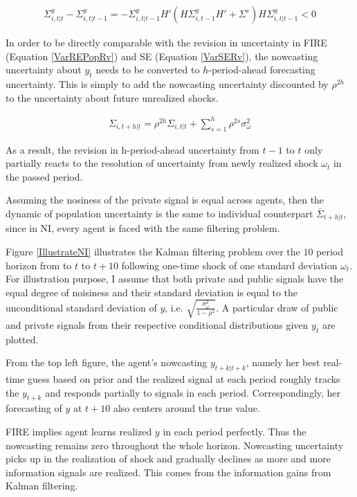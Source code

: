 \documentclass[]{article}
\begin{document}
	\begin{eqnarray}\label{VarNIRv}
		\Sigma^y_{i,t|t} - \Sigma^y_{i,t|t-1} = - \Sigma^y_{i,t|t-1} H'(H \Sigma^y_{i,t-1} H' +\Sigma^v) H \Sigma^y_{i,t|t-1} <0
	\end{eqnarray}
	
	In order to be directly comparable with the revision in uncertainty in FIRE (Equation \ref{VarREPopRv}) and SE (Equation \ref{VarSERv}), the nowcasting uncertainty about $y_t$ needs to be converted to $h$-period-ahead forecasting uncertainty. This is simply to add the nowcasting uncertainty discounted by $\rho^{2h}$ to the uncertainty about future unrealized shocks.   
	
	\begin{eqnarray}\label{VarNIEq}
		\Sigma_{i,t+h|t} = \rho^{2h} \Sigma_{i,t|t} + \sum^{h}_{s=1}\rho^{2s} \sigma^2_{\omega}
	\end{eqnarray}
	
	As a result, the revision in h-period-ahead uncertainty from $t-1$ to $t$ only partially reacts to the resolution of  uncertainty from newly realized shock $\omega_t$ in the passed period. 
	
	Assuming the nosiness of the private signal is equal across agents, then the dynamic of population uncertainty is the same to individual counterpart $\bar \Sigma_{t+h|t}$, since in NI, every agent is faced with the same filtering problem.  
	
	Figure \ref{IllustrateNI} illustrates the Kalman filtering problem over the $10$ period horizon from to $t$ to $t+10$  following one-time shock of one standard deviation $\omega_t$.  For illustration purpose, I assume that both private and public signals have the equal degree of noisiness and their standard deviation is equal to the unconditional standard deviation of $y$, i.e. $\sqrt{\frac{\sigma^2_\omega}{1-\rho^2}}$.  A particular draw of public and private signals from their respective conditional distributions given $y_t$ are plotted.    
	
	From the top left figure, the agent's nowcasting $y_{t+k|t+k}$, namely her best real-time guess based on prior and the realized signal at each period roughly tracks the $y_{t+k}$ and responds partially to signals in each period. Correspondingly, her forecasting of $y$ at $t+10$ also centers around the true value. 
	
	FIRE implies agent learns realized $y$ in each period perfectly. Thus the nowcasting remains zero throughout the whole horizon. Nowcasting uncertainty picks up in the realization of shock and gradually declines as more and more information signals are realized. This comes from the information gains from Kalman filtering. 
	
\end{document}
